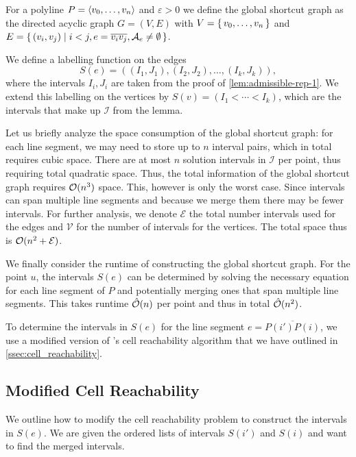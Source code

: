 \begin{definition}
	For a polyline \(P = \left\langle v_0, \dots, v_n\right\rangle\) and \(\varepsilon > 0\) we define the global shortcut graph as the directed acyclic graph \(G = (V, E)\) with \(V = \set{v_0, \dots, v_n}\) and \(E = \set{(v_i, v_j) \mid i < j, e = \overline{v_iv_j}, \mathcal{A}_e \neq \emptyset}\).

	We define a labelling function on the edges 
	\[S(e) = ((I_1, J_1), (I_2, J_2), \dots, (I_k, J_k)),\]
	where the intervals \(I_i, J_i\) are taken from the proof of \cref{lem:admissible-rep-1}. We extend this labelling on the vertices by \(S(v) = (I_1 < \cdots < I_k)\), which are the intervals that make up \(\mathcal{I}\) from the lemma.
\end{definition}

Let us briefly analyze the space consumption of the global shortcut graph: for each line segment, we may need to store up to \(n\) interval pairs, which in total requires cubic space. There are at most \(n\) solution intervals in \(\mathcal{I}\) per point, thus requiring total quadratic space. Thus, the total information of the global shortcut graph requires \(\mathcal{O}(n^3)\) space. This, however is only the worst case. Since intervals can span multiple line segments and because we merge them there may be fewer intervals. For further analysis, we denote \(\mathcal{E}\) the total number intervals used for the edges and \(\mathcal{V}\) for the number of intervals for the vertices. The total space thus is \(\mathcal{O}(n^2 + \mathcal{E})\).

We finally consider the runtime of constructing the global shortcut graph. For the point \(u\), the intervals \(S(e)\) can be determined by solving the necessary equation for each line segment of \(P\) and potentially merging ones that span multiple line segments. This takes runtime \(\hat{\mathcal{O}}(n)\) per point and thus in total \(\hat{\mathcal{O}}(n^2)\). 

To determine the intervals in \(S(e)\) for the line segment \(e = \overline{P(i')P(i)}\), we use a modified version of \citeauthor{polyline_simplification_has_cubic_complexity_bringmannetal}'s cell reachability algorithm that we have outlined in \cref{ssec:cell_reachability}.

\subsection{Modified Cell Reachability}
We outline how to modify the cell reachability problem to construct the intervals in \(S(e)\). We are given the ordered lists of intervals \(S(i')\) and \(S(i)\) and want to find the merged intervals. 


